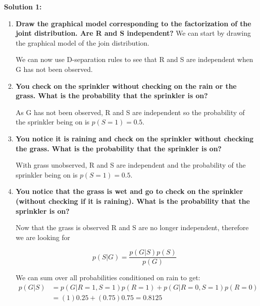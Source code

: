 \documentclass[submit]{harvardml}
\newcommand{\attr}[1]{\textsf{#1}}
\begin{document}
\newpage
\textbf{Solution 1:}
\begin{enumerate}
    \item \textbf{Draw the graphical model corresponding to the factorization of the joint distribution. Are R and S independent?}
    We can start by drawing the graphical model of the join distribution.
    
    
    We can now use D-separation rules to see that R and S are independent when G has not been observed.
    \item \textbf{ You check on the sprinkler without checking on the rain or the grass.  What is the probability that the sprinkler is on?}
    
    As G has not been observed, R and S are independent so the probability of the sprinkler being on is $p(S = 1) = 0.5$.
    
    \item \textbf{You notice it is raining and check on the sprinkler without checking the grass. What is the probability that the sprinkler is on?}
    
    With grass unobserved, R and S are independent and the probability of the sprinkler being on is  $p(S = 1) = 0.5$.
    
    \item \textbf{You notice that the grass is wet and go to check on the sprinkler (without checking if it is raining). What is the probability that the sprinkler is on?}
    
    Now that the grass is observed R and S are no longer independent, therefore we are looking for 
    
    $$
    p(S | G) = \frac{p(G|S)p(S)}{p(G)}
    $$
    
    We can sum over all probabilities conditioned on rain to get:
    \begin{align*}
        p(G|S) &= p(G|R=1,S=1)p(R=1) + p(G|R=0,S=1)p(R=0) \\
        &= (1)0.25 + (0.75)0.75 = 0.8125
    \end{align*}
    

\end{enumerate}
\end{document}
